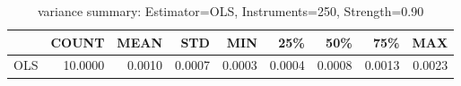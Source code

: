 \begin{table}[ht]
\centering
\caption{variance summary: Estimator=OLS, Instruments=250, Strength=0.90}
\begin{tabular}{lrrrrrrrr}
\toprule
 & COUNT & MEAN & STD & MIN & 25\% & 50\% & 75\% & MAX \\
\midrule
OLS & 10.0000 & 0.0010 & 0.0007 & 0.0003 & 0.0004 & 0.0008 & 0.0013 & 0.0023 \\
\bottomrule
\end{tabular}
\end{table}
